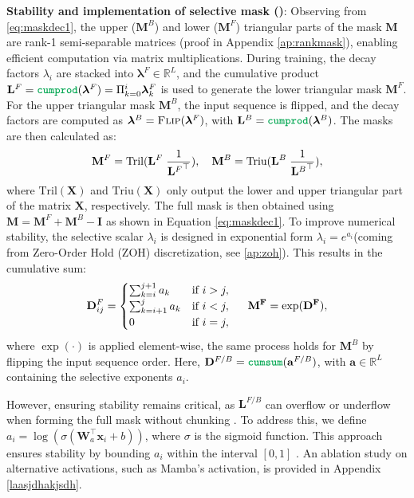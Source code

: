 \textbf{Stability and implementation of selective mask (\colorbox{orange!17}{\lions})}: 
Observing from \cref{eq:maskdec1}, the upper (\(\mathbf{M}^B\)) and lower (\(\mathbf{M}^F\)) triangular parts of the mask \(\mathbf{M}\) are rank-1 semi-separable matrices (proof in Appendix \ref{ap:rankmask}), enabling efficient computation via matrix multiplications. During training, the decay factors \(\lambda_i\) are stacked into \(\boldsymbol{\lambda}^F \in \mathbb{R}^L\), and the cumulative product \(\mathbf{L}^F = \cumprod(\boldsymbol{\lambda}^F) = \Pi^i_{k=0}\boldsymbol{\lambda}^F_k\) is used to generate the lower triangular mask \(\mathbf{M}^F\). For the upper triangular mask \(\mathbf{M}^B\), the input sequence is flipped, and the decay factors are computed as \(\boldsymbol{\lambda}^B = \textsc{Flip}(\boldsymbol{\lambda}^F)\), with \(\mathbf{L}^B = \cumprod(\boldsymbol{\lambda}^B)\). The masks are then calculated as:  
\[
\mathbf{M}^F = \text{Tril} (\mathbf{L}^F \hspace{1mm} \frac{1}{{\mathbf{L}^F}^\top}), \quad \mathbf{M}^B = \text{Triu}(\mathbf{L}^B \hspace{1mm} \frac{1}{{\mathbf{L}^B}^\top}),
\]
where $\text{Tril}(\mathbf{X})$ and $\text{Triu}(\mathbf{X})$ only output the lower and upper triangular part of the matrix $\mathbf{X}$, respectively. The full mask is then obtained using $\mathbf{M} = \mathbf{M}^F + \mathbf{M}^B - \mathbf{I}$ as shown in Equation \cref{eq:maskdec1}. To improve numerical stability, the selective scalar \(\lambda_i\) is designed in exponential form \(\lambda_i = e^{a_i}\)(coming from Zero-Order Hold (ZOH) discretization, see \cref{ap:zoh}). This results in the cumulative sum:
\[
\mathbf{D}^F_{ij} = 
\begin{cases} 
\sum_{k=i}^{j+1}{a_k} & \text{if } i > j,  \\
\sum_{k=i+1}^{j}{a_k} & \text{if } i < j,  \\
0 & \text{if } i = j,
\end{cases}
\hspace{5mm} \mathbf{M^F} = \exp(\mathbf{D^F}),
\]
where \(\exp(\cdot)\) is applied element-wise, the same process holds for \(\mathbf{M}^B\) by flipping the input sequence order. Here, \(\mathbf{D}^{F/B} = \cumsum(\mathbf{a}^{F/B})\), with \(\mathbf{a} \in \mathbb{R}^L\) containing the selective exponents \(a_i\). 

However, ensuring stability remains critical, as \(\mathbf{L}^{F/B}\) can overflow or underflow when forming the full mask without chunking \cite{mamba2}. To address this, we define \(a_i = \log(\sigma(\mathbf{W}_{a}^\top\mathbf{x}_i + b))\), where \(\sigma\) is the sigmoid function. This approach ensures stability by bounding \(a_i\) within the interval \([0,1]\) \cite{lru}. An ablation study on alternative activations, such as Mamba's activation, is provided in Appendix \ref{laasjdhakjsdh}.

